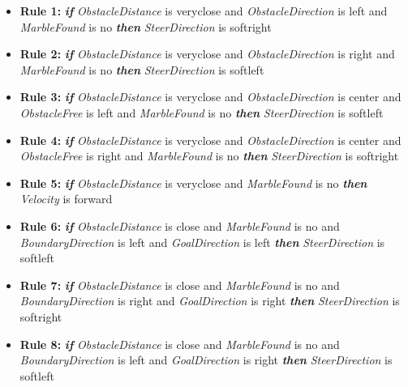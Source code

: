 \documentclass[../Head/Main.tex]{subfiles}
\begin{document}
\begin{itemize}
\item {\large \textbf{Rule 1:}} \textbf{\textit{if}} \textit{ObstacleDistance} is veryclose and \textit{ObstacleDirection} is left and \textit{MarbleFound} is no \textbf{\textit{then}} \textit{SteerDirection} is softright
 
\item {\large \textbf{Rule 2:}} \textbf{\textit{if}} \textit{ObstacleDistance} is veryclose and \textit{ObstacleDirection} is right and \textit{MarbleFound} is no \textbf{\textit{then}} \textit{SteerDirection} is softleft
 
\item {\large \textbf{Rule 3:}} \textbf{\textit{if}} \textit{ObstacleDistance} is veryclose and \textit{ObstacleDirection} is center and \textit{ObstacleFree} is left and \textit{MarbleFound} is no \textbf{\textit{then}} \textit{SteerDirection} is softleft
 
\item {\large \textbf{Rule 4:}} \textbf{\textit{if}} \textit{ObstacleDistance} is veryclose and \textit{ObstacleDirection} is center and \textit{ObstacleFree} is right and \textit{MarbleFound} is no \textbf{\textit{then}} \textit{SteerDirection} is softright
 
\item {\large \textbf{Rule 5:}} \textbf{\textit{if}} \textit{ObstacleDistance} is veryclose and \textit{MarbleFound} is no \textbf{\textit{then}} \textit{Velocity} is forward

\item {\large \textbf{Rule 6:}} \textbf{\textit{if}} \textit{ObstacleDistance} is close and \textit{MarbleFound} is no and \textit{BoundaryDirection} is left and \textit{GoalDirection} is left \textbf{\textit{then}} \textit{SteerDirection} is softleft
 
\item {\large \textbf{Rule 7:}} \textbf{\textit{if}} \textit{ObstacleDistance} is close and \textit{MarbleFound} is no and \textit{BoundaryDirection} is right and \textit{GoalDirection} is right \textbf{\textit{then}} \textit{SteerDirection} is softright
 
\item {\large \textbf{Rule 8:}} \textbf{\textit{if}} \textit{ObstacleDistance} is close and \textit{MarbleFound} is no and \textit{BoundaryDirection} is left and \textit{GoalDirection} is right \textbf{\textit{then}} \textit{SteerDirection} is softleft
 

\end{itemize}
\end{document}
